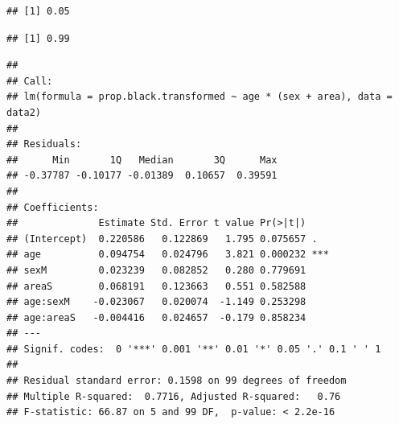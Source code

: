 \documentclass[
]{article}
\newenvironment{Shaded}{\begin{snugshade}}{\end{snugshade}}
\newcommand{\AttributeTok}[1]{\textcolor[rgb]{0.77,0.63,0.00}{#1}}
\newcommand{\CommentTok}[1]{\textcolor[rgb]{0.56,0.35,0.01}{\textit{#1}}}
\newcommand{\FunctionTok}[1]{\textcolor[rgb]{0.00,0.00,0.00}{#1}}
\newcommand{\NormalTok}[1]{#1}
\newcommand{\OtherTok}[1]{\textcolor[rgb]{0.56,0.35,0.01}{#1}}
\newcommand{\SpecialCharTok}[1]{\textcolor[rgb]{0.00,0.00,0.00}{#1}}
\begin{document}
\begin{Shaded}
\end{Shaded}

\begin{verbatim}
## [1] 0.05
\end{verbatim}

\begin{Shaded}
\end{Shaded}

\begin{verbatim}
## [1] 0.99
\end{verbatim}

\begin{Shaded}
\end{Shaded}

\begin{verbatim}
## 
## Call:
## lm(formula = prop.black.transformed ~ age * (sex + area), data = data2)
## 
## Residuals:
##      Min       1Q   Median       3Q      Max 
## -0.37787 -0.10177 -0.01389  0.10657  0.39591 
## 
## Coefficients:
##              Estimate Std. Error t value Pr(>|t|)    
## (Intercept)  0.220586   0.122869   1.795 0.075657 .  
## age          0.094754   0.024796   3.821 0.000232 ***
## sexM         0.023239   0.082852   0.280 0.779691    
## areaS        0.068191   0.123663   0.551 0.582588    
## age:sexM    -0.023067   0.020074  -1.149 0.253298    
## age:areaS   -0.004416   0.024657  -0.179 0.858234    
## ---
## Signif. codes:  0 '***' 0.001 '**' 0.01 '*' 0.05 '.' 0.1 ' ' 1
## 
## Residual standard error: 0.1598 on 99 degrees of freedom
## Multiple R-squared:  0.7716, Adjusted R-squared:   0.76 
## F-statistic: 66.87 on 5 and 99 DF,  p-value: < 2.2e-16
\end{verbatim}
\end{document}
